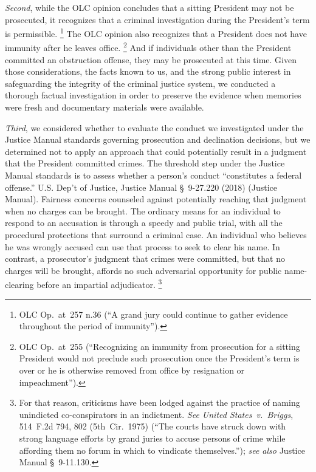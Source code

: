 \textit{Second}, while the OLC opinion concludes that a sitting President may not be prosecuted, it recognizes that a criminal investigation during the President's term is permissible.%
\footnote{OLC Op.\ at~257 n.36 (``A grand jury could continue to gather evidence throughout the period of immunity'').}
The OLC opinion also recognizes that a President does not have immunity after he leaves office.%
\footnote{OLC Op.\ at~255 (``Recognizing an immunity from prosecution for a sitting President would not preclude such prosecution once the President's term is over or he is otherwise removed from office by resignation or impeachment'').}
And if individuals other than the President committed an obstruction offense, they may be prosecuted at this time.
Given those considerations, the facts known to us, and the strong public interest in safeguarding the integrity of the criminal justice system, we conducted a thorough factual investigation in order to preserve the evidence when memories were fresh and documentary materials were available.

\textit{Third}, we considered whether to evaluate the conduct we investigated under the Justice Manual standards governing prosecution and declination decisions, but we determined not to apply an approach that could potentially result in a judgment that the President committed crimes.
The threshold step under the Justice Manual standards is to assess whether a person's conduct
``constitutes a federal offense.''
U.S. Dep't of Justice, Justice Manual \S~9-27.220 (2018) (Justice Manual).
Fairness concerns counseled against potentially reaching that judgment when no charges can be brought.
The ordinary means for an individual to respond to an accusation is through a speedy and public trial, with all the procedural protections that surround a criminal case.
An individual who believes he was wrongly accused can use that process to seek to clear his name.
In contrast, a prosecutor's judgment that crimes were committed, but that no charges will be brought, affords no such adversarial opportunity for public name-clearing before an impartial adjudicator.%
\footnote{For that reason, criticisms have been lodged against the practice of naming unindicted co-conspirators in an indictment.
\textit{See United States~v.\ Briggs}, 514~F.2d 794, 802 (5th~Cir.~1975) (``The courts have struck down with strong language efforts by grand juries to accuse persons of crime while affording them no forum in which to vindicate themselves.'');
\textit{see also} Justice Manual \S~9-11.130.}

